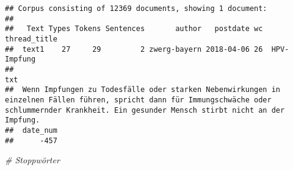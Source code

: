 \documentclass[
]{book}
\newenvironment{Shaded}{\begin{snugshade}}{\end{snugshade}}
\newcommand{\CommentTok}[1]{\textcolor[rgb]{0.56,0.35,0.01}{\textit{#1}}}
\begin{document}
\begin{verbatim}
## Corpus consisting of 12369 documents, showing 1 document:
## 
##   Text Types Tokens Sentences       author   postdate wc thread_title
##  text1    27     29         2 zwerg-bayern 2018-04-06 26  HPV-Impfung
##                                                                                                                                                                                                  txt
##  Wenn Impfungen zu Todesfälle oder starken Nebenwirkungen in einzelnen Fällen führen, spricht dann für Immungschwäche oder schlummernder Krankheit. Ein gesunder Mensch stirbt nicht an der Impfung.
##  date_num
##      -457
\end{verbatim}

\begin{Shaded}
\begin{Highlighting}[]
\CommentTok{# Stoppwörter}

\end{Highlighting}
\end{Shaded}
\end{document}

